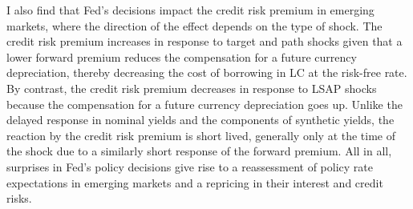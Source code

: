 {I also find that Fed's decisions impact the credit risk premium in emerging markets, where the direction of the effect depends on the type of shock.
The credit risk premium increases in response to target and path shocks given that a lower forward premium reduces the compensation for a future currency depreciation, thereby decreasing the cost of borrowing in LC at the risk-free rate.
By contrast, the credit risk premium decreases in response to LSAP shocks because the compensation for a future currency depreciation goes up.
Unlike the delayed response in nominal yields and the components of synthetic yields, the reaction by the credit risk premium is short lived, generally only at the time of the shock due to a similarly short response of the forward premium.
All in all, surprises in Fed's policy decisions give rise to a reassessment of policy rate expectations in emerging markets and a repricing in their interest and credit risks.

}
